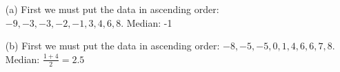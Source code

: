 %

{
{
\begin{enumerate}
\item[(a)] First we must put the data in ascending order: $-9, -3,  -3,  -2, -1,  3,  4, 6,  8$. Median: -1
\item[(b)] First we must put the data in ascending order: $-8, -5, -5,  0,  1,  4,  6,  6,  7,  8$. Median: $\frac{1+4}{2} = 2.5$
\end{enumerate}
}}

%


